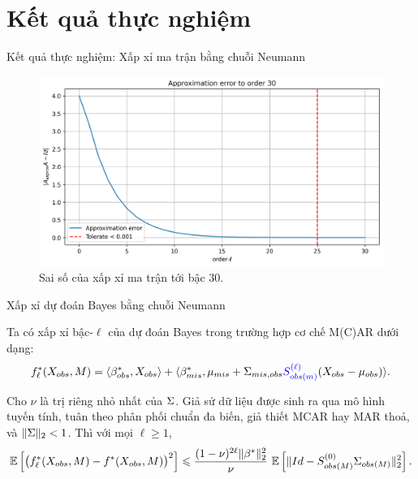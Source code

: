 \documentclass[aspectratio=169, 10pt]{beamer} %
\begin{document}
\section*{Kết quả thực nghiệm}
\begin{frame}{Kết quả thực nghiệm: Xấp xỉ ma trận bằng chuỗi Neumann}
    \begin{figure}[h]
        \centering
        \includegraphics[width=.8\textwidth]{approx_neumann.png}
        \caption{
            Sai số của xấp xỉ ma trận tới bậc $30$.
        }
    \end{figure}
\end{frame}

\begin{frame}{Xấp xỉ dự đoán Bayes bằng chuỗi Neumann}

    Ta có xấp xỉ bậc-$\ell$ của dự đoán Bayes trong trường hợp cơ chế M(C)AR dưới dạng:
    \begin{equation*}\label{eq:l_approximation_mcar_bayes_predictor}
        f_{\ell}^* (X_{obs}, M) = \langle\beta_{obs}^{*},X_{obs} \rangle+\langle\beta_{mis}^{*},\mu_{mis} + \Sigma_{mis,obs} \textcolor{blue}{S_{obs(m)}^{(\ell)}} (X_{obs}-\mu_{obs})\rangle.
    \end{equation*}
    
    \begin{prop}\label{prop:error_approximation}
       Cho $\nu$ là trị riêng nhỏ nhất của $\Sigma$. Giả sử dữ liệu được sinh ra qua mô hình tuyến tính, tuân theo phân phối chuẩn đa biến, giả thiết MCAR hay MAR thoả, và $\|\Sigma\|_2 < 1$. Thì với mọi $\ell \geq 1$,
       \begin{equation*}\label{eq:aprrox_error}
           \mathbb{E} \left[\left(f_{\ell}^* (X_{obs}, M) - f^* (X_{obs}, M)\right)^2\right] 
           \leqslant \dfrac{(1-\nu)^{2\ell} \|\beta^*\|_2^2}{\nu} \ \mathbb{E}\left[ \|Id - S_{obs(M)}^{(0)} \Sigma_{obs(M)}\|_2^2\right].
       \end{equation*}
    \end{prop}
\end{frame}
\end{document}
